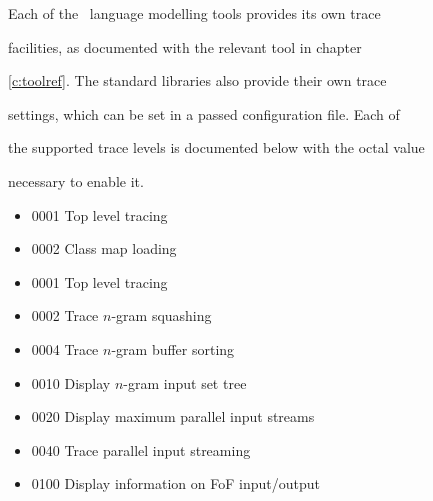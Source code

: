 Each of the \HTK\ language modelling tools provides its own trace


facilities, as documented with the relevant tool in chapter


\ref{c:toolref}.  The standard libraries also provide their own trace


settings, which can be set in a passed configuration file.  Each of


the supported trace levels is documented below with the octal value


necessary to enable it.







\begin{itemize}


\item 0001       Top level tracing


\item 0002       Class map loading


\end{itemize}







\begin{itemize}


\item 0001       Top level tracing


\item 0002       Trace $n$-gram squashing


\item 0004       Trace $n$-gram buffer sorting


\item 0010       Display $n$-gram input set tree


\item 0020       Display maximum parallel input streams


\item 0040       Trace parallel input streaming


\item 0100       Display information on FoF input/output


\end{itemize}








